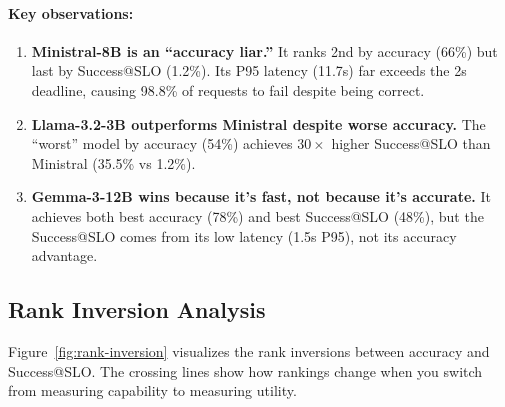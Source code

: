 \documentclass[11pt]{article}
\begin{document}
\paragraph{Key observations:}

\begin{enumerate}[leftmargin=12pt]
    \item \textbf{Ministral-8B is an ``accuracy liar.''} It ranks 2nd by accuracy (66\%) but last by Success@SLO (1.2\%). Its P95 latency (11.7s) far exceeds the 2s deadline, causing 98.8\% of requests to fail despite being correct.

    \item \textbf{Llama-3.2-3B outperforms Ministral despite worse accuracy.} The ``worst'' model by accuracy (54\%) achieves $30\times$ higher Success@SLO than Ministral (35.5\% vs 1.2\%).

    \item \textbf{Gemma-3-12B wins because it's fast, not because it's accurate.} It achieves both best accuracy (78\%) and best Success@SLO (48\%), but the Success@SLO comes from its low latency (1.5s P95), not its accuracy advantage.
\end{enumerate}

\subsection{Rank Inversion Analysis}

Figure~\ref{fig:rank-inversion} visualizes the rank inversions between accuracy and Success@SLO.
The crossing lines show how rankings change when you switch from measuring capability to measuring utility.
\end{document}

